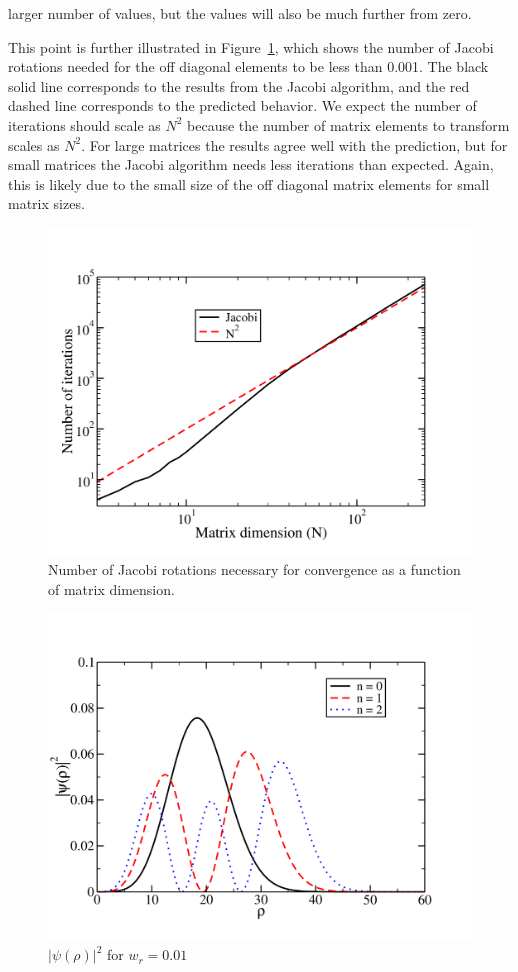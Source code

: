 \documentclass[prc,amsmath,twocolumn,superscriptaddress]{revtex4}
\begin{document}
\noindent larger number of values, but the values will also be much further from zero. 

This point is further illustrated in Figure~\ref{trans}, which shows the number of Jacobi rotations needed for the off diagonal elements to be less than 0.001. The black solid line corresponds to the results from the Jacobi algorithm, and the red dashed line corresponds to the predicted behavior. We expect the number of iterations should scale as $N^2$ because the number of matrix elements to transform scales as $N^2$. For large matrices the results agree well with the prediction, but for small matrices the Jacobi algorithm needs less iterations than expected. Again, this is likely due to the small size of the off diagonal matrix elements for small matrix sizes.

\begin{figure}[b]
\includegraphics[scale=0.33]{N_trans.pdf}
\caption{Number of Jacobi rotations necessary for convergence as a function of matrix dimension.}
\label{trans}
\end{figure}

\begin{figure}[t]
\includegraphics[scale=0.33]{wf_01.pdf}
\caption{$|\psi(\rho)|^2$ for $w_r = 0.01$}
\label{wf_01}
\end{figure}
\end{document}
